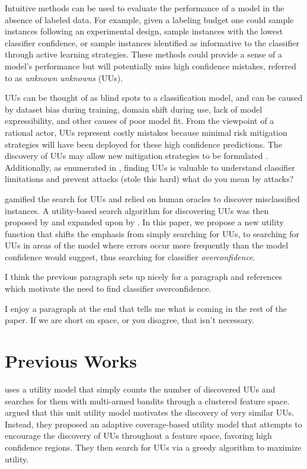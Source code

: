 \documentclass[letterpaper]{article} %
\newcommand{\km}[1]{{\color{red} #1}} %
\newcommand{\wdb}[1]{{\color{blue} #1}} %
\begin{document}
Intuitive methods can be used to evaluate the performance of a model in the absence of labeled data.  For example, given a labeling budget one could sample instances following an experimental design, sample instances with the lowest classifier confidence, or sample instances identified as informative to the classifier through active learning strategies.  These methods could provide a sense of a model's performance but will potentially miss high confidence mistakes, referred to as \textit{unknown unknowns} (UUs).     

UUs can be thought of as blind spots to a classification model, and can be caused by dataset bias during training, domain shift during use, lack of model expressibility, and other causes of poor model fit.  From the viewpoint of a rational actor, UUs represent costly mistakes because minimal risk mitigation strategies will have been deployed for these high confidence predictions.  The discovery of UUs may allow new mitigation strategies to be formulated \citep{Nushi2016a}.  \wdb{Additionally, as enumerated in \citep{Bansal2018}, finding UUs is valuable to understand classifier limitations and prevent attacks (stole this hard)} \km{what do you mean by attacks?}

\citet{Attenberg2015} gamified the search for UUs and relied on human oracles to discover misclassified instances. A utility-based search algorithm for discovering UUs was then proposed by \citet{Lakkaraju2016} and expanded upon by \citet{Bansal2018}. In this paper, we propose a new utility function that shifts the emphasis from simply searching for UUs, to searching for UUs in areas of the model where errors occur more frequently than the model confidence would suggest, thus searching for classifier \textit{overconfidence}. 

\wdb{I think the previous paragraph sets up nicely for a paragraph and references which motivate the need to find classifier overconfidence.}

\wdb{I enjoy a paragraph at the end that tells me what is coming in the rest of the paper. If we are short on space, or you disagree, that isn't necessary.}

\section{Previous Works}

\citet{Lakkaraju2016} uses a utility model that simply counts the number of discovered UUs and searches for them with multi-armed bandits through a clustered feature space. \citet{Bansal2018} argued that this unit utility model motivates the discovery of very similar UUs. Instead, they proposed an adaptive coverage-based utility model that attempts to encourage the discovery of UUs throughout a feature space, favoring high confidence regions. They then search for UUs via a greedy algorithm to maximize utility.
\end{document}
